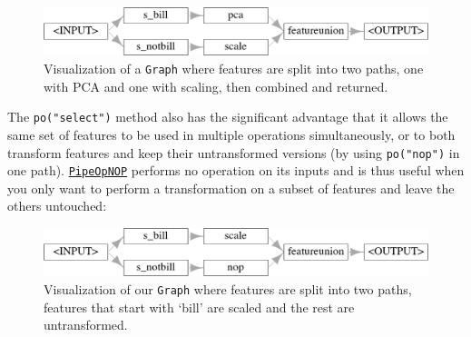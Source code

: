 \begin{figure}

{\centering \includegraphics[width=1\textwidth,height=\textheight]{chapters/chapter8/non-sequential_pipelines_and_tuning_files/figure-pdf/fig-pipelines-pcascale-1.png}

}

\caption{\label{fig-pipelines-pcascale}Visualization of a \texttt{Graph}
where features are split into two paths, one with PCA and one with
scaling, then combined and returned.}

\end{figure}

The \texttt{po("select")} method also has the significant advantage that
it allows the same set of features to be used in multiple operations
simultaneously, or to both transform features and keep their
untransformed versions (by using \texttt{po("nop")} in one path).
\href{https://mlr3pipelines.mlr-org.com/reference/mlr_pipeops_nop.html}{\texttt{PipeOpNOP}}
performs no operation on its inputs and is thus useful when you only
want to perform a transformation on a subset of features and leave the
others untouched:

\begin{Shaded}
\begin{Highlighting}[]
\OtherTok{=} \NormalTok{(}\NormalTok{(}
\SpecialCharTok{\%\textgreater{}\textgreater{}\%} \NormalTok{(}\NormalTok{),}
\SpecialCharTok{\%\textgreater{}\textgreater{}\%} \NormalTok{(}\NormalTok{)}
\NormalTok{)) }\SpecialCharTok{\%\textgreater{}\textgreater{}\%} \NormalTok{(}\NormalTok{)}
\SpecialCharTok{$}\NormalTok{(} \NormalTok{)}
\end{Highlighting}
\end{Shaded}

\begin{figure}

{\centering \includegraphics[width=1\textwidth,height=\textheight]{chapters/chapter8/non-sequential_pipelines_and_tuning_files/figure-pdf/fig-pipelines-selectnop-1.png}

}

\caption{\label{fig-pipelines-selectnop}Visualization of our
\texttt{Graph} where features are split into two paths, features that
start with `bill' are scaled and the rest are untransformed.}

\end{figure}

